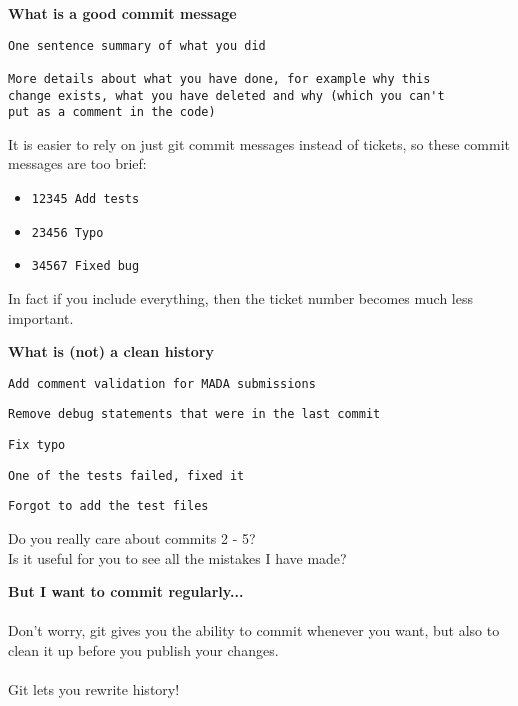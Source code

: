 \documentclass[landscape]{slides}
\begin{document}
\begin{slide}
\textbf{What is a good commit message}\\
\begin{verbatim}
One sentence summary of what you did

More details about what you have done, for example why this
change exists, what you have deleted and why (which you can't
put as a comment in the code)
\end{verbatim}
It is easier to rely on just git commit messages instead of tickets, so these
commit messages are too brief:\\
\vspace{-18mm}
\begin{itemize}
\item{\tt 12345 Add tests}
\vspace{-10mm}
\item{\tt 23456 Typo}
\vspace{-10mm}
\item{\tt 34567 Fixed bug}
\end{itemize}
In fact if you include everything, then the ticket number becomes much less
important.
\end{slide}

\begin{slide}
\textbf{What is (not) a clean history}
\begin{enumerate}
{\item {\tt Add comment validation for MADA submissions}}
\vspace{-10mm}
{\item {\tt Remove debug statements that were in the last commit}}
\vspace{-10mm}
{\item {\tt Fix typo}}
\vspace{-10mm}
{\item {\tt One of the tests failed, fixed it}}
\vspace{-10mm}
{\item {\tt Forgot to add the test files}}
\end{enumerate}
Do you really care about commits 2 - 5?\\
Is it useful for you to see all the mistakes I have made?\\
\end{slide}

\begin{slide}
\textbf{But I want to commit regularly...}\\
\\
Don't worry, git gives you the ability to commit whenever you want, but also to
clean it up before you publish your changes.\\
\\
Git lets you rewrite history!
\end{slide}
\end{document}
